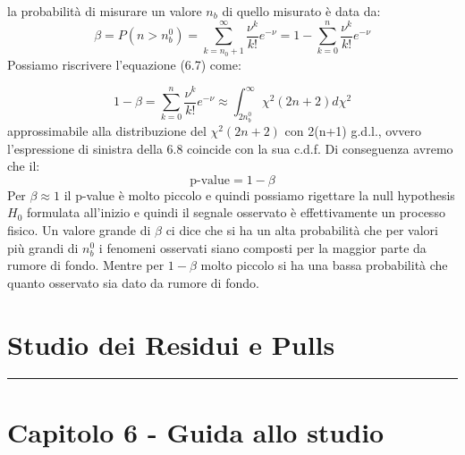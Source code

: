 \noindent la probabilit\`{a} di misurare un valore $n_b$ di quello misurato \`{e} data da:
\begin{equation}
	\beta = P(n > n_b^{0}) = \sum_{k =n_0+1}^{\infty}\dfrac{\nu^k}{k!}e^{-\nu} = 1- \sum_{k =0}^{n}\dfrac{\nu^k}{k!}e^{-\nu}  	
\end{equation}
Possiamo riscrivere l'equazione (6.7) come:

\begin{equation}
	1-\beta = \sum_{k =0}^{n}\dfrac{\nu^k}{k!}e^{-\nu} \approx \int_{2n_{b}^0}^{\infty}\chi^2(2n+2)d\chi^2
\end{equation} 
\newline
approssimabile alla distribuzione del $\chi^2(2n+2)$ con 2(n+1) g.d.l., ovvero l'espressione di sinistra della 6.8 coincide con la sua c.d.f. Di conseguenza avremo che il:
\begin{equation*}
	\text{p-value} = 1- \beta
\end{equation*}
Per $\beta \approx 1$ il p-value \`{e} molto piccolo e quindi possiamo rigettare la null hypothesis $H_0$ formulata all'inizio e quindi il segnale osservato \`{e} effettivamente un processo fisico. Un valore grande di $\beta$ ci dice che si ha un alta probabilit\`{a} che per valori pi\`{u} grandi di $n_b^0$ i fenomeni osservati siano composti per la maggior parte da rumore di fondo. Mentre per $1-\beta$ molto piccolo si ha una bassa probabilit\`{a} che quanto osservato sia dato da rumore di fondo.

\section{Studio dei Residui e Pulls}

\vspace{0.05cm}
\par\noindent\rule{\textwidth}{2pt}

\section{Capitolo 6 - Guida allo studio}

